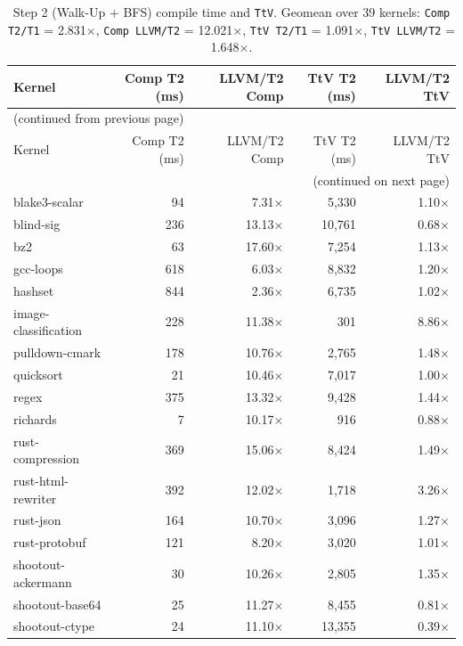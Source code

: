 \begin{longtable}{l r r r r}
\caption{Step 2 (Walk-Up + BFS) compile time and \texttt{TtV}. Geomean over 39 kernels: \texttt{Comp T2/T1} = 2.831$\times$, \texttt{Comp LLVM/T2} = 12.021$\times$, \texttt{TtV T2/T1} = 1.091$\times$, \texttt{TtV LLVM/T2} = 1.648$\times$.}
\label{tbl:appB:step2:ct}\\
\toprule
Kernel & Comp T2 (ms) & LLVM/T2 Comp & TtV T2 (ms) & LLVM/T2 TtV \\
\midrule
\endfirsthead
\multicolumn{5}{l}{\small (continued from previous page)} \\
\toprule
Kernel & Comp T2 (ms) & LLVM/T2 Comp & TtV T2 (ms) & LLVM/T2 TtV \\
\midrule
\endhead
\midrule
\multicolumn{5}{r}{\small (continued on next page)} \\
\endfoot
\bottomrule
\endlastfoot
blake3-scalar & 94 & 7.31$\times$ & 5{,}330 & 1.10$\times$ \\
blind-sig & 236 & 13.13$\times$ & 10{,}761 & 0.68$\times$ \\
bz2 & 63 & 17.60$\times$ & 7{,}254 & 1.13$\times$ \\
gcc-loops & 618 & 6.03$\times$ & 8{,}832 & 1.20$\times$ \\
hashset & 844 & 2.36$\times$ & 6{,}735 & 1.02$\times$ \\
image-classification & 228 & 11.38$\times$ & 301 & 8.86$\times$ \\
pulldown-cmark & 178 & 10.76$\times$ & 2{,}765 & 1.48$\times$ \\
quicksort & 21 & 10.46$\times$ & 7{,}017 & 1.00$\times$ \\
regex & 375 & 13.32$\times$ & 9{,}428 & 1.44$\times$ \\
richards & 7 & 10.17$\times$ & 916 & 0.88$\times$ \\
rust-compression & 369 & 15.06$\times$ & 8{,}424 & 1.49$\times$ \\
rust-html-rewriter & 392 & 12.02$\times$ & 1{,}718 & 3.26$\times$ \\
rust-json & 164 & 10.70$\times$ & 3{,}096 & 1.27$\times$ \\
rust-protobuf & 121 & 8.20$\times$ & 3{,}020 & 1.01$\times$ \\
shootout-ackermann & 30 & 10.26$\times$ & 2{,}805 & 1.35$\times$ \\
shootout-base64 & 25 & 11.27$\times$ & 8{,}455 & 0.81$\times$ \\
shootout-ctype & 24 & 11.10$\times$ & 13{,}355 & 0.39$\times$ \\

\end{longtable}
